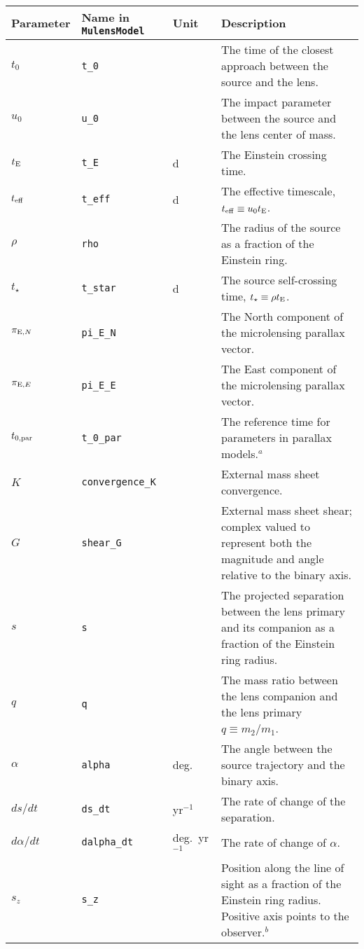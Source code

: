 \documentclass[12pt]{article}
\newcommand\MM{{\tt MulensModel}}
\begin{document}
\begin{landscape}
\captionsetup{width=20cm}
\begin{longtable}{l l l p{12cm}}
Parameter & Name in \MM &  Unit & Description \\
\hline
$t_0$ & {\tt t\_0} & & The time of the closest approach between the source and the lens. \\
$u_0$ & {\tt u\_0} & & The impact parameter between the source and the lens center of mass. \\
$t_{\rm E}$ & {\tt t\_E} & d & The Einstein crossing time. \\
$t_{\rm eff}$ & {\tt t\_eff} & d & The effective timescale, $t_{\rm eff} \equiv u_0 t_{\rm E}$. \\
$\rho$ & {\tt rho} & & The radius of the source as a fraction of the Einstein ring. \\
$t_{\star}$ & {\tt t\_star} & d & The source self-crossing time, $t_\star \equiv \rho t_{\rm E}$. \\
$\pi_{{\rm E}, N}$ & {\tt pi\_E\_N} & & The North component of the microlensing parallax vector. \\
$\pi_{{\rm E}, E}$ & {\tt pi\_E\_E} & & The East component of the microlensing parallax vector. \\
$t_{0,{\rm par}}$ & {\tt t\_0\_par} & & The reference time for parameters in parallax models.$^a$ \\
$K$ & {\tt convergence\_K} & & External mass sheet convergence. \\
$G$ & {\tt shear\_G} & & External mass sheet shear; complex valued to represent both the magnitude and angle relative to the binary axis. \\
$s$ & {\tt s} & & The projected separation between the lens primary and its companion as a fraction of the Einstein ring radius. \\
$q$ & {\tt q} & & The mass ratio between the lens companion and the lens primary $q \equiv m_2/m_1$. \\
$\alpha$ & {\tt alpha} & deg. & The angle between the source trajectory and the binary axis. \\
$ds/dt$ & {\tt ds\_dt} & yr$^{-1}$ & The rate of change of the separation. \\
$d\alpha/dt$ & {\tt dalpha\_dt} & deg.~yr$^{-1}$ & The rate of change of $\alpha$. \\
$s_{z}$ & {\tt s\_z} & & Position along the line of sight as a fraction of the Einstein ring radius. Positive axis points to the observer.$^b$\\

\end{longtable}
\end{landscape}
\end{document}
